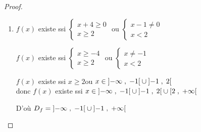 \begin{proof}
\begin{enumerate}
\item $ f(x) $ existe ssi $ \begin{cases} x+4 \geq 0 \\ x\geq 2\end{cases}$  ou $ \begin{cases} x-1 \neq 0 \\ x< 2\end{cases}$

 $ f(x) $ existe ssi $ \begin{cases} x \geq -4 \\ x\geq 2\end{cases}$  ou $ \begin{cases} x\neq -1 \\ x< 2\end{cases}$
 
 $ f(x) $ existe ssi  $ x \geq 2 $\quad  ou $ x\in \left]-\infty \;,\; -1\right[\cup \left]-1 \;,\; 2\right[ $ \\ donc $ f(x) $ existe ssi $ x\in\left]-\infty \;,\; -1\right[\cup \left]-1 \;,\; 2\right[ \cup\left[2 \;,\; +\infty\right[$ 

 D'où $ D_{f}=\left]-\infty \;,\; -1\right[\cup \left]-1 \;,\; +\infty\right[$
 

\end{enumerate}
\end{proof}
